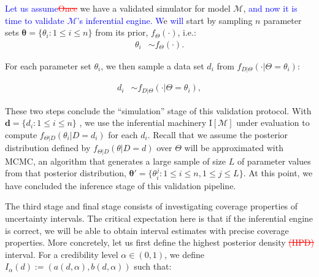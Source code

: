 \documentclass[oneside]{article}
\begin{document}
\textcolor{blue}{Let us assume}\textcolor{red}{\st{Once}} we have a validated simulator for model $\mathcal{M}$, \textcolor{blue}{and now it is time to validate $\mathcal{M}$'s inferential engine. W}e \textcolor{blue}{will} start by sampling $n$ parameter sets $\boldsymbol{\theta} = \{\theta_i : 1 \leq i \leq n\}$ from its prior,
$f_\Theta(\cdot)$, i.e.:
\begin{align*}
 \theta_i & \sim f_\Theta(\cdot).
\end{align*}

For each parameter set $\theta_i$, we then sample a data set
$d_i$ from
$f_{D|\Theta}(\cdot|\Theta=\theta_i)$:

\vspace{-1cm}
\begin{align*}
   d_i & \sim  f_{D|\Theta}(\cdot | \Theta=\theta_i),
\end{align*}

These two steps conclude the ``simulation'' stage of this validation protocol.
With
$\boldsymbol{d} = \{d_i: 1 \leq i \leq n\}$
, we use the inferential machinery $\text{I}[\mathcal{M}]$ under
evaluation to compute
$f_{\Theta|D}(\theta_i|D=d_i)$ for each $d_i$.
Recall that we assume the posterior distribution defined by $f_{\Theta|D}(\theta|D=d)$ over $\Theta$ will be approximated with MCMC, an algorithm that generates a large sample of size $L$ of parameter values from that posterior distribution, $\boldsymbol{\theta}' = \{ \theta_i^j: 1 \leq i \leq n, 1 \leq j \leq L\}$.
At this point, we have concluded the inference stage of this validation pipeline.

The third stage and final stage consists of investigating coverage properties of uncertainty intervals.
The critical expectation here is that if the inferential engine is correct, we will be able to obtain interval estimates with precise coverage properties.
More concretely, let us first define the highest posterior density \textcolor{red}{\st{(HPD)}} interval.
For a credibility level $\alpha \in (0, 1)$, we define $I_\alpha(d) := (a(d, \alpha), b(d, \alpha))$
such that:

\end{document}
